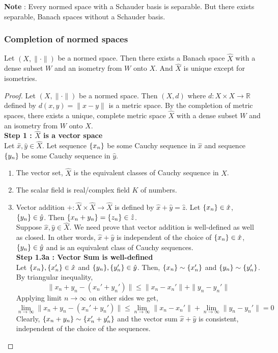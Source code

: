 \textbf{Note} : Every normed space with a Schauder basis is separable.
But there exists separable, Banach spaces without a Schauder basis.

\subsubsection{Completion of normed spaces}
\begin{theorem}[completion]
	Let $(X,\|\cdot\|)$ be a normed space.
	Then there exists a Banach space $\hat{X}$ with a dense subset $W$ and an isometry from $W$ onto $X$.
	And $\hat{X}$ is unique except for isometries.
\end{theorem}
\begin{proof}
	Let $(X,\|\cdot\|)$ be a normed space.
	Then $(X,d)$ where $d : X \times X \to \mathbb{R}$ defined by $d(x,y) = \| x-y \|$ is a metric space.
	By the completion of metric spaces, there exists a unique, complete metric space $\hat{X}$ with a dense subset $W$ and an isometry from $W$ onto $X$.\\

	\textbf{Step 1 : $\hat{X}$ is a vector space}\\
	Let $\hat{x},\hat{y} \in \hat{X}$.
	Let sequence $\{x_n\}$ be some Cauchy sequence in $\hat{x}$ and sequence $\{y_n\}$ be some Cauchy sequence in $\hat{y}$.
	\begin{enumerate}
		\item The vector set, $\hat{X}$ is the equivalent classes of Cauchy sequence in $X$.
		\item The scalar field is real/complex field $K$ of numbers.
		\item Vector addition $+ : \hat{X} \times \hat{X} \to \hat{X}$ is defined by $\hat{x} + \hat{y} = \hat{z}$.
			Let $\{x_n\} \in \hat{x}$, $\{y_n\} \in \hat{y}$.
			Then $\{x_n+y_n\} = \{z_n\} \in \hat{z}$.\\

			Suppose $\hat{x},\hat{y} \in \hat{X}$.
			We need prove that vector addition is well-defined as well as closed.
			In other words, $\hat{x}+\hat{y}$ is independent of the choice of $\{x_n\} \in \hat{x}$, $\{y_n\} \in \hat{y}$ and is an equivalent class of Cauchy sequences.\\

			\textbf{Step 1.3a : Vector Sum is well-defined}\\
			Let $\{x_n\},\{x_n'\} \in \hat{x}$ and $\{y_n\},\{y_n'\} \in \hat{y}$.
			Then, $\{x_n\} \sim \{x_n'\}$ and $\{y_n\} \sim \{y_n'\}$.
			By triangular inequality,
			$$ \| x_n + y_n - (x_n' + y_n') \| \le \| x_n - x_n'\| + \| y_n - y_n' \| $$
			Applying limit $n \to \infty $ on either sides we get,
			$$ \lim_{n \to \infty} \| x_n + y_n - (x_n'+y_n') \| \le \lim_{n \to \infty} \| x_n - x_n' \| + \lim_{n \to \infty} \| y_n - y_n' \| = 0 $$
			Clearly, $\{x_n+y_n\} \sim \{x_n'+y_n'\}$ and the vector sum $\hat{x}+\hat{y}$ is consistent, independent of the choice of the sequences.\\


\end{enumerate}
\end{proof}

